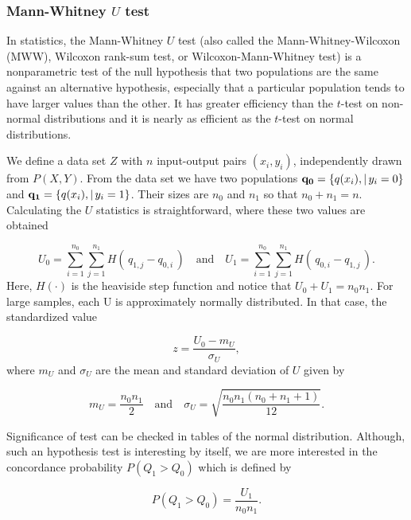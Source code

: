 \subsubsection{Mann-Whitney $U$ test}
\label{sec:U}

In statistics, the Mann-Whitney $U$ test (also called the Mann-Whitney-Wilcoxon (MWW), Wilcoxon rank-sum test, or Wilcoxon-Mann-Whitney test) is a nonparametric test of the null hypothesis that two populations are the same against an alternative hypothesis, especially that a particular population tends to have larger values than the other.  It has greater efficiency than the $t$-test on non-normal distributions and it is nearly as efficient as the $t$-test on normal distributions.

We define a data set $Z$ with $n$ input-output pairs $(x_i, y_i)$, independently drawn from $P(X,Y)$.  From the data set we have two populations $\mathbf{q_0} = \{q(x_i) , | \, y_i = 0 \}$ and $\mathbf{q_1} = \{q(x_i) , | \, y_i = 1 \}$.  Their sizes are $n_0$ and $n_1$ so that $n_0 + n_1 = n$.  Calculating the $U$ statistics is straightforward, where these two values are obtained 

\begin{equation}
\label{eq:U}
U_0 = \sum_{i=1}^{n_0}\sum_{j=1}^{n_1} H(\,q_{1,j} - q_{0,i}    \,) \quad \mbox{and} \quad 
U_1 = \sum_{i=1}^{n_0}\sum_{j=1}^{n_1} H( \,q_{0,i} - q_{1,j}    \,).
\end{equation}
Here, $H(\cdot)$ is the heaviside step function and notice that $U_0 + U_1 = n_0n_1$.  For large samples, each U is approximately normally distributed. In that case, the standardized value

\begin{equation}
\label{eq:z}
z = \frac{U_0 - m_{U}}{\sigma_{U}},
\end{equation}
where $m_U$ and $\sigma_U$ are the mean and standard deviation of $U$ given by

\begin{equation}
\label{eq:z}
m_U = \frac{n_0n_1}{2} \quad \mbox{and} \quad 
\sigma_U = \sqrt{\frac{n_0n_1(n_0 + n_1 + 1)}{12} }.
\end{equation}

Significance of test can be checked in tables of the normal distribution.  Although, such an hypothesis test is interesting by itself, we are more interested in the concordance probability $P(Q_1 > Q_0)$ which is defined by

\begin{equation}
\label{eq:concordance}
P(Q_1 > Q_0) = \frac{U_1}{n_0n_1}.
\end{equation}

